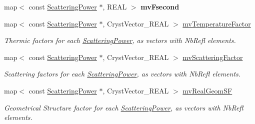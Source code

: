 \begin{DoxyCompactItemize}
map$<$ const \mbox{\hyperlink{class_obj_cryst_1_1_scattering_power}{Scattering\+Power}} $\ast$, R\+E\+AL $>$ {\bfseries mv\+Fsecond}
\item 
\mbox{\label{class_obj_cryst_1_1_scattering_data_a66d5208047bdd6bf1eb066926adc676f}} 
map$<$ const \mbox{\hyperlink{class_obj_cryst_1_1_scattering_power}{Scattering\+Power}} $\ast$, Cryst\+Vector\+\_\+\+R\+E\+AL $>$ \mbox{\hyperlink{class_obj_cryst_1_1_scattering_data_a66d5208047bdd6bf1eb066926adc676f}{mv\+Temperature\+Factor}}
\begin{DoxyCompactList}\small\item\em Thermic factors for each \mbox{\hyperlink{class_obj_cryst_1_1_scattering_power}{Scattering\+Power}}, as vectors with Nb\+Refl elements. \end{DoxyCompactList}\item 
\mbox{\label{class_obj_cryst_1_1_scattering_data_a130783a5c9beffd3791ee1885953b4cd}} 
map$<$ const \mbox{\hyperlink{class_obj_cryst_1_1_scattering_power}{Scattering\+Power}} $\ast$, Cryst\+Vector\+\_\+\+R\+E\+AL $>$ \mbox{\hyperlink{class_obj_cryst_1_1_scattering_data_a130783a5c9beffd3791ee1885953b4cd}{mv\+Scattering\+Factor}}
\begin{DoxyCompactList}\small\item\em Scattering factors for each \mbox{\hyperlink{class_obj_cryst_1_1_scattering_power}{Scattering\+Power}}, as vectors with Nb\+Refl elements. \end{DoxyCompactList}\item 
\mbox{\label{class_obj_cryst_1_1_scattering_data_a938a4a024e6fd830786bb22d1171c084}} 
map$<$ const \mbox{\hyperlink{class_obj_cryst_1_1_scattering_power}{Scattering\+Power}} $\ast$, Cryst\+Vector\+\_\+\+R\+E\+AL $>$ \mbox{\hyperlink{class_obj_cryst_1_1_scattering_data_a938a4a024e6fd830786bb22d1171c084}{mv\+Real\+Geom\+SF}}
\begin{DoxyCompactList}\small\item\em Geometrical Structure factor for each \mbox{\hyperlink{class_obj_cryst_1_1_scattering_power}{Scattering\+Power}}, as vectors with Nb\+Refl elements. \end{DoxyCompactList}\item 
\mbox{\label{class_obj_cryst_1_1_scattering_data_a5dbceac44c1e2f76279dc4e6160c47eb}} 

\end{DoxyCompactItemize}
